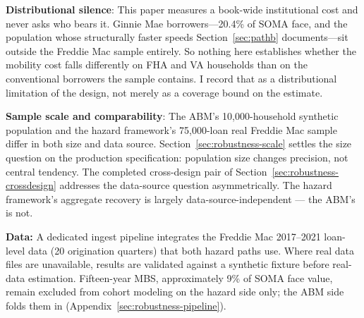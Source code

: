 \documentclass[12pt]{article}
\begin{document}
\textbf{Distributional silence}: This paper measures a book-wide institutional cost and never asks who bears it. Ginnie Mae borrowers---20.4\% of SOMA face, and the population whose structurally faster speeds Section~\ref{sec:pathb} documents---sit outside the Freddie Mac sample entirely. So nothing here establishes whether the mobility cost falls differently on FHA and VA households than on the conventional borrowers the sample contains. I record that as a distributional limitation of the design, not merely as a coverage bound on the estimate.

\textbf{Sample scale and comparability}: The ABM's 10,000-household synthetic population and the hazard framework's 75,000-loan real Freddie Mac sample differ in both size and data source. Section~\ref{sec:robustness-scale} settles the size question on the production specification: population size changes precision, not central tendency. The completed cross-design pair of Section~\ref{sec:robustness-crossdesign} addresses the data-source question asymmetrically. The hazard framework's aggregate recovery is largely data-source-independent --- the ABM's is not.

\textbf{Data:} A dedicated ingest pipeline integrates the Freddie Mac 2017--2021 loan-level data (20 origination quarters) that both hazard paths use. Where real data files are unavailable, results are validated against a synthetic fixture before real-data estimation. Fifteen-year MBS, approximately 9\% of SOMA face value, remain excluded from cohort modeling on the hazard side only; the ABM side folds them in (Appendix~\ref{sec:robustness-pipeline}).
\end{document}
